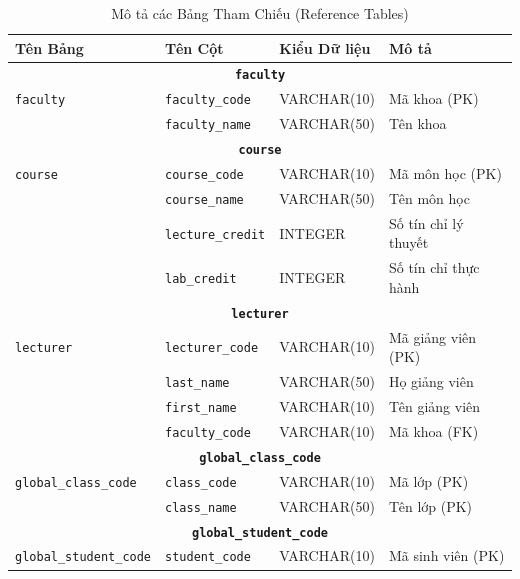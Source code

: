\documentclass[conference]{IEEEtran}
\begin{document}
\begin{table}[htbp]
\caption{Mô tả các Bảng Tham Chiếu (Reference Tables)}
\label{tab:reference_tables}
\centering
\begin{tabular}{|l|l|l|p{5cm}|}
\hline
\textbf{Tên Bảng} & \textbf{Tên Cột} & \textbf{Kiểu Dữ liệu} & \textbf{Mô tả} \\
\hline
\multicolumn{4}{|c|}{\textbf{\texttt{faculty}}} \\
\hline
\texttt{faculty} & \texttt{faculty\_code} & VARCHAR(10) & Mã khoa (PK) \\
                 & \texttt{faculty\_name} & VARCHAR(50) & Tên khoa \\
\hline
\multicolumn{4}{|c|}{\textbf{\texttt{course}}} \\
\hline
\texttt{course} & \texttt{course\_code} & VARCHAR(10) & Mã môn học (PK) \\
                & \texttt{course\_name} & VARCHAR(50) & Tên môn học \\
                & \texttt{lecture\_credit} & INTEGER & Số tín chỉ lý thuyết \\
                & \texttt{lab\_credit} & INTEGER & Số tín chỉ thực hành \\
\hline
\multicolumn{4}{|c|}{\textbf{\texttt{lecturer}}} \\
\hline
\texttt{lecturer} & \texttt{lecturer\_code} & VARCHAR(10) & Mã giảng viên (PK) \\
                  & \texttt{last\_name} & VARCHAR(50) & Họ giảng viên \\
                  & \texttt{first\_name} & VARCHAR(10) & Tên giảng viên \\
                  & \texttt{faculty\_code} & VARCHAR(10) & Mã khoa (FK) \\
\hline
\multicolumn{4}{|c|}{\textbf{\texttt{global\_class\_code}}} \\
\hline
\texttt{global\_class\_code} & \texttt{class\_code} & VARCHAR(10) & Mã lớp (PK) \\
                            & \texttt{class\_name} & VARCHAR(50) & Tên lớp (PK) \\
\hline
\multicolumn{4}{|c|}{\textbf{\texttt{global\_student\_code}}} \\
\hline
\texttt{global\_student\_code} & \texttt{student\_code} & VARCHAR(10) & Mã sinh viên (PK) \\
\hline
\end{tabular}
\end{table}
\end{document}
